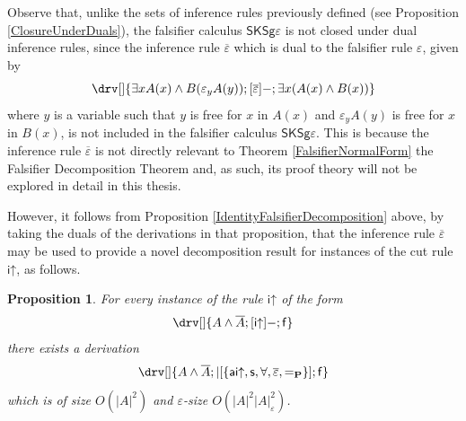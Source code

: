 \documentclass[10pt]{article}
\newtheorem{proposition}[theorem]{Proposition}
\theoremstyle{definition}\newtheorem{remark}[theorem]{Remark}
\theoremstyle{definition}\newtheorem{example}[theorem]{Example}
\theoremstyle{definition}\newtheorem{definition}[theorem]{Definition}
\newcommand{\FalsifierCalculus}{{\mathsf{SKSg\varepsilon}}}
\newcommand{\aiUp}{{\mathsf{ai\mathord\uparrow}}}
\newcommand{\iUp}{{\mathsf{i\mathord\uparrow}}}
\newcommand{\switch}{{\mathsf{s}}}
\newcommand{\falsifierRule}{{\mathsf{\varepsilon}}}
\newcommand{\eqProp}{=_{\textbf{P}}}
\newcommand{\falseUnit}{\mathsf{f}}
\begin{document}
	Observe that, unlike the sets of inference rules previously defined (see Proposition \ref{ClosureUnderDuals}), the falsifier calculus $\FalsifierCalculus$ is not closed under dual inference rules, since the inference rule $\overline{\falsifierRule}$ which is dual to the falsifier rule $\falsifierRule$, given by
	\[
		\drv[] {
			\exists x A(x) \land B(\varepsilon_y A(y)) ; [\overline{\falsifierRule}]- ; \exists x (A(x) \land B(x))
		}
	\]
	where $y$ is a variable such that $y$ is free for $x$ in $A(x)$ and $\varepsilon_y A(y)$ is free for $x$ in $B(x)$, is not included in the falsifier calculus $\FalsifierCalculus$. This is because the inference rule $\overline{\falsifierRule}$ is not directly relevant to Theorem \ref{FalsifierNormalForm} the Falsifier Decomposition Theorem and, as such, its proof theory will not be explored in detail in this thesis.
	
	However, it follows from Proposition \ref{IdentityFalsifierDecomposition} above, by taking the duals of the derivations in that proposition, that the inference rule $\overline{\falsifierRule}$ may be used to provide a novel decomposition result for instances of the cut rule $\iUp$, as follows.
	
	\begin{proposition}
		For every instance of the rule $\iUp$ of the form
		\[
			\drv[] {
				A \land \overline{A} ; [\iUp]- ; \falseUnit
			}
		\]
		there exists a derivation
		\[
			\drv[] {
				A \land \overline{A} ; |[\{\aiUp, \switch, \forall, \overline{\falsifierRule}, \eqProp\}] ; \falseUnit
			}
		\]
		which is of size $O(| A |^2)$ and $\varepsilon$-size $O(| A |^2 | A |_\varepsilon^2)$.
	\end{proposition}
\end{document}
